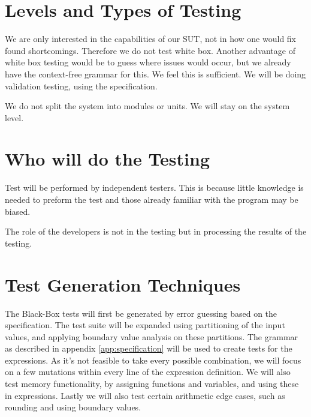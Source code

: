 \documentclass[11pt,a4paper]{article}
\begin{document}
\section{Levels and Types of Testing} \label{levels}

We are only interested in the capabilities of our SUT, not in how one
would fix found shortcomings. Therefore we do not test white box. Another advantage of white box testing would be to guess where issues would occur, but we already have the context-free grammar for this. We feel this is sufficient. %
We will be doing validation testing, using the specification.

We do not split the system into modules or units. We will stay on the system level.


\section{Who will do the Testing}

Test will be performed by independent testers. This is because little
knowledge is needed to preform the test and those already familiar
with the program may be biased. \label{sec:test-generation}

The role of the developers is not in the testing but in processing the
results of the testing.






\section{Test Generation Techniques}
The Black-Box tests will first be generated by error guessing based on the specification. The test suite will be expanded using partitioning of the input values, and applying boundary value analysis on these partitions.
The grammar as described in appendix \ref{app:specification} will be used to create tests for the expressions. As it's not feasible to take every possible combination, we will focus on a few mutations within every line of the expression definition.
We will also test memory functionality, by assigning functions and variables, and using these in expressions. Lastly we will also test certain arithmetic edge cases, such as rounding and using boundary values.
\end{document}
